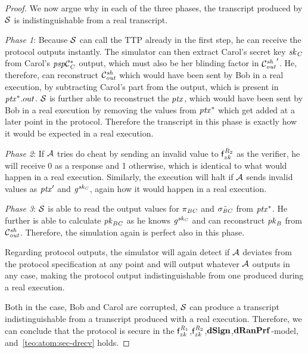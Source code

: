 \begin{proof}
    We now argue why in each of the three phases, the transcript produced by $\mathcal{S}$ is indistinguishable from a real transcript.

    \begin{asparaitem}
        \item \textit{Phase 1}: Because $\mathcal{S}$ can call the TTP already in the first step, he can receive the protocol outputs instantly.
        The simulator can then extract Carol's secret key $\mathit{sk}_{\mathit{C}}$ from Carol's $\mathit{psp}\mathcal{C}_{\mathit{C}}^*$ output, which must also be her blinding factor in ${\mathcal{C}_{\mathit{out}}^{\mathit{sh}}}'$.
        He, therefore, can reconstruct $\mathcal{C}_{\mathit{out}}^{\mathit{sh}}$ which would have been sent by Bob in a real execution, by subtracting Carol's part from the output, which is present in $\mathit{ptx}^*.out$.
        $\mathcal{S}$ is further able to reconstruct the $\mathit{ptx}$, which would have been sent by Bob in a real execution by removing the values from $\mathit{ptx}^*$ which get added at a later point in the protocol.
        Therefore the transcript in this phase is exactly how it would be expected in a real execution.
        \item \textit{Phase 2}: If $\mathcal{A}$ tries do cheat by sending an invalid value to $\mathsf{f}^{\mathit{R}_2}_{zk}$ as the verifier, he will receive 0 as a response and 1 otherwise, which is identical to what would happen in a real execution.
        Similarly, the execution will halt if $\mathcal{A}$ sends invalid values as ${\mathit{ptx}}'$ and $\mathit{g}^{\mathit{sk}_{\mathit{C}}}$, again how it would happen in a real execution.
        \item \textit{Phase 3}: $\mathcal{S}$ is able to read the output values for $\pi_{\mathit{B}\mathit{C}}$ and $\tilde{\sigma_{\mathit{B}\mathit{C}}}$ from $\mathit{ptx}^*$.
        He further is able to calculate $\mathit{pk}_{\mathit{B}\mathit{C}}$ as he knows $\mathit{g}^{\mathit{sk}_{\mathit{C}}}$ and can reconstruct $\mathit{pk}_{\mathit{B}}$ from $\mathcal{C}_{\mathit{out}}^{\mathit{sh}}$.
        Therefore, the simulation again is perfect also in this phase.
        \item Regarding protocol outputs, the simulator will again detect if $\mathcal{A}$ deviates from the protocol specification at any point and will output whatever $\mathcal{A}$ outputs in any case, making the protocol output indistinguishable from one produced during a real execution.
    \end{asparaitem}

    Both in the case, Bob and Carol are corrupted, $\mathcal{S}$ can produce a transcript indistinguishable from a transcript produced with a real execution.
    Therefore, we can conclude that the protocol is secure in the $\mathsf{f}^{\mathit{R}_1}_{zk}$,$\mathsf{f}^{\mathit{R}_2}_{zk}$,$\mathbf{dSign}$,$\mathbf{dRanPrf}$-model, and~\cref{teo:atom:sec-drecv} holds.
\end{proof}


